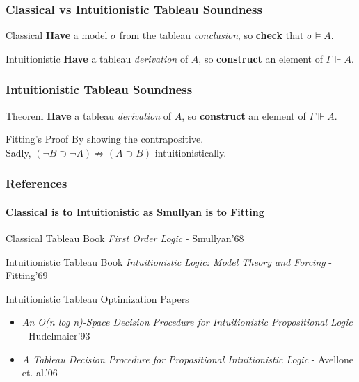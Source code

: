 \documentclass[mathserif]{beamer}
\def\imp{\supset}
\newcommand{\sat}[1]{\sigma \vDash #1}
\newcommand{\force}[1]{\Gamma \Vdash #1}
\begin{document}
\begin{frame}
\frametitle{Classical vs Intuitionistic Tableau Soundness}

\begin{block}{Classical}
{\bf Have} a model $\sigma$ from the tableau {\it conclusion}, so
{\bf check} that $\sat{A}$.
\end{block}

\begin{block}{Intuitionistic}
{\bf Have} a tableau {\it derivation} of $A$, so
{\bf construct} an element of $\force{A}$.
\end{block}

\end{frame}

\begin{frame}
\frametitle{Intuitionistic Tableau Soundness}

\begin{block}{Theorem}
{\bf Have} a tableau {\it derivation} of $A$, so
{\bf construct} an element of $\force{A}$.
\end{block}

\begin{block}{Fitting's Proof}
By showing the contrapositive.\\
Sadly, $(\neg B \imp \neg A) \nRightarrow (A \imp B)$ intuitionistically.
\end{block}

\end{frame}

\begin{frame}
\frametitle{References}
\framesubtitle{Classical is to Intuitionistic as Smullyan is to Fitting}

\begin{block}{Classical Tableau Book}
{\it First Order Logic} - Smullyan'68
\end{block}

\begin{block}{Intuitionistic Tableau Book}
{\it Intuitionistic Logic: Model Theory and Forcing} - Fitting'69
\end{block}

\begin{block}{Intuitionistic Tableau Optimization Papers}
\begin{itemize}
\item {\it An O(n log n)-Space Decision Procedure for Intuitionistic Propositional Logic} - Hudelmaier'93
\item {\it A Tableau Decision Procedure for Propositional Intuitionistic Logic} - Avellone et. al.'06
\end{itemize}
\end{block}

\end{frame}
\end{document}
